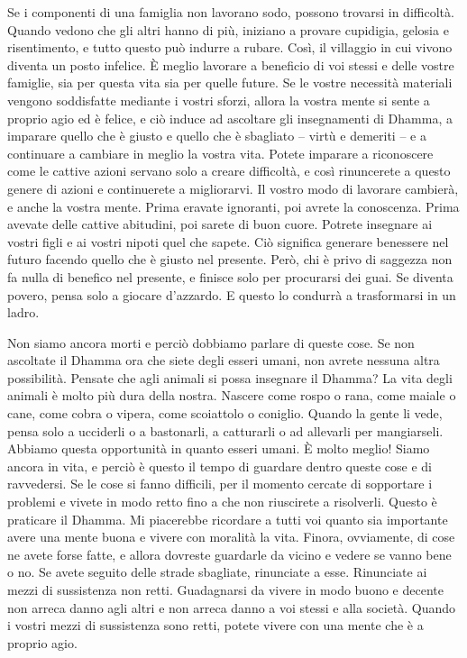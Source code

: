 Se i componenti di una famiglia non lavorano sodo, possono trovarsi in
difficoltà. Quando vedono che gli altri hanno di più, iniziano a provare
cupidigia, gelosia e risentimento, e tutto questo può indurre a rubare.
Così, il villaggio in cui vivono diventa un posto infelice. È meglio
lavorare a beneficio di voi stessi e delle vostre famiglie, sia per
questa vita sia per quelle future. Se le vostre necessità materiali
vengono soddisfatte mediante i vostri sforzi, allora la vostra mente si
sente a proprio agio ed è felice, e ciò induce ad ascoltare gli
insegnamenti di Dhamma, a imparare quello che è giusto e quello che è
sbagliato -- virtù e demeriti -- e a continuare a cambiare in meglio la
vostra vita. Potete imparare a riconoscere come le cattive azioni
servano solo a creare difficoltà, e così rinuncerete a questo genere di
azioni e continuerete a migliorarvi. Il vostro modo di lavorare
cambierà, e anche la vostra mente. Prima eravate ignoranti, poi avrete
la conoscenza. Prima avevate delle cattive abitudini, poi sarete di buon
cuore. Potrete insegnare ai vostri figli e ai vostri nipoti quel che
sapete. Ciò significa generare benessere nel futuro facendo quello che è
giusto nel presente. Però, chi è privo di saggezza non fa nulla di
benefico nel presente, e finisce solo per procurarsi dei guai. Se
diventa povero, pensa solo a giocare d'azzardo. E questo lo condurrà a
trasformarsi in un ladro.

Non siamo ancora morti e perciò dobbiamo parlare di queste cose. Se non
ascoltate il Dhamma ora che siete degli esseri umani, non avrete nessuna
altra possibilità. Pensate che agli animali si possa insegnare il
Dhamma? La vita degli animali è molto più dura della nostra. Nascere
come rospo o rana, come maiale o cane, come cobra o vipera, come
scoiattolo o coniglio. Quando la gente li vede, pensa solo a ucciderli o
a bastonarli, a catturarli o ad allevarli per mangiarseli. Abbiamo
questa opportunità in quanto esseri umani. È molto meglio! Siamo ancora
in vita, e perciò è questo il tempo di guardare dentro queste cose e di
ravvedersi. Se le cose si fanno difficili, per il momento cercate di
sopportare i problemi e vivete in modo retto fino a che non riuscirete a
risolverli. Questo è praticare il Dhamma. Mi piacerebbe ricordare a
tutti voi quanto sia importante avere una mente buona e vivere con
moralità la vita. Finora, ovviamente, di cose ne avete forse fatte, e
allora dovreste guardarle da vicino e vedere se vanno bene o no. Se
avete seguito delle strade sbagliate, rinunciate a esse. Rinunciate ai
mezzi di sussistenza non retti. Guadagnarsi da vivere in modo buono e
decente non arreca danno agli altri e non arreca danno a voi stessi e
alla società. Quando i vostri mezzi di sussistenza sono retti, potete
vivere con una mente che è a proprio agio.

